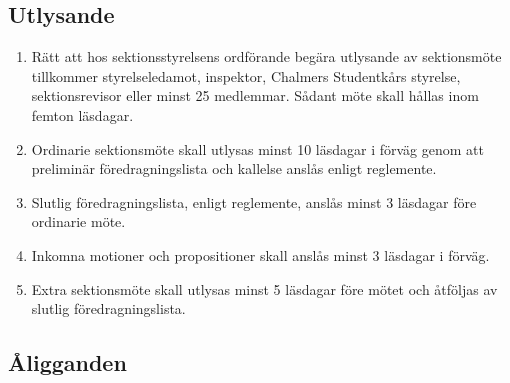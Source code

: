 \documentclass[11pt,a4paper]{article}
\begin{document}
\subsection{Utlysande}

\begin{enumerate}[\thesubsection .1]

  \label{subsec:utlysande}

  \item Rätt att hos sektionsstyrelsens ordförande begära utlysande av
  sek\-tions\-möte tillkommer styrelseledamot, inspektor,  Chalmers Studentkårs styrelse, sek\-ti\-ons\-revisor  eller minst 25 medlemmar. Sådant möte skall hållas inom femton läsdagar.

  \item Ordinarie sektionsmöte skall utlysas minst 10 läsdagar i
  förväg genom att preliminär föredragningslista och kallelse an\-slås enligt
  reglemente. 
  
  \item Slutlig föredragningslista, enligt reglemente, anslås minst 3 läsdagar före ordinarie möte. 
  
  \item Inkomna motioner och propositioner skall anslås
  minst 3 läsdagar i förväg.
  

  \item Extra sektionsmöte skall utlysas minst 5 läsdagar före mötet
  och åt\-följ\-as av slutlig föredragningslista.

\end{enumerate}

\subsection{Åligganden}
\end{document}
